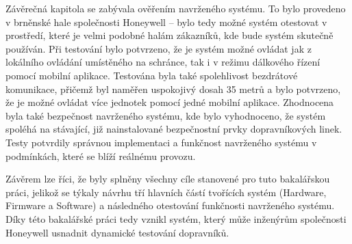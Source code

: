 Závěrečná kapitola se zabývala ověřením navrženého systému. To bylo provedeno v brněnské hale společnosti Honeywell – bylo tedy možné systém otestovat v prostředí, které je velmi podobné halám zákazníků, kde bude systém skutečně používán. Při testování bylo potvrzeno, že je systém možné ovládat jak z lokálního ovládání umístěného na schránce, tak i v režimu dálkového řízení pomocí mobilní aplikace. Testována byla také spolehlivost bezdrátové komunikace, přičemž byl naměřen uspokojivý dosah 35 metrů a bylo potvrzeno, že je možné ovládat více jednotek pomocí jedné mobilní aplikace. Zhodnocena byla také bezpečnost navrženého systému, kde bylo vyhodnoceno, že systém spoléhá na stávající, již nainstalované bezpečnostní prvky dopravníkových linek. Testy potvrdily správnou implementaci a funkčnost navrženého systému v podmínkách, které se blíží reálnému provozu.

Závěrem lze říci, že byly splněny všechny cíle stanovené pro tuto bakalářskou práci, jelikož se týkaly návrhu tří hlavních částí tvořících systém (Hardware, Firmware a Software) a následného otestování funkčnosti navrženého systému. Díky této bakalářské práci tedy vznikl systém, který může inženýrům společnosti Honeywell usnadnit dynamické testování dopravníků.